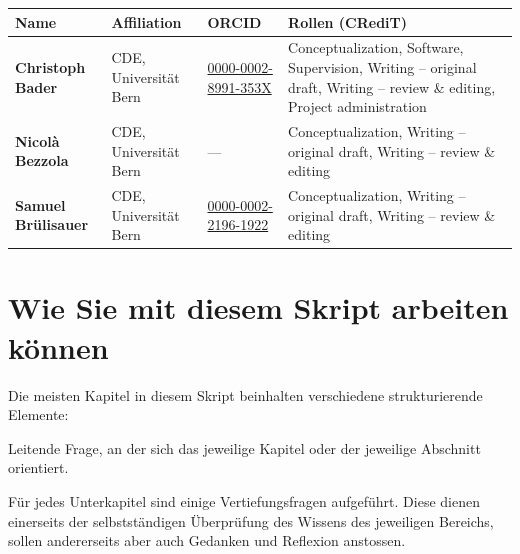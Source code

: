 \documentclass[
  nswissgerman,
  a4paper,
  DIV=11,
  numbers=noendperiod,
  oneside,
  openany]{scrreprt}
\begin{document}
\begin{table}[!h]
\centering\begingroup\fontsize{8}{10}\selectfont

\begin{tabular}[t]{>{\raggedright\arraybackslash}p{2.5cm}ll>{\raggedright\arraybackslash}p{6cm}}
\toprule
\textbf{Name} & \textbf{Affiliation} & \textbf{ORCID} & \textbf{Rollen (CRediT)}\\
\midrule
\textbf{Christoph Bader} & CDE, Universität Bern & \href{https://orcid.org/0000-0002-8991-353X}{0000-0002-8991-353X} & Conceptualization, Software, Supervision, Writing – original draft, Writing – review \& editing, Project administration\\
\textbf{Nicolà Bezzola} & CDE, Universität Bern & — & Conceptualization, Writing – original draft, Writing – review \& editing\\
\textbf{Samuel Brülisauer} & CDE, Universität Bern & \href{https://orcid.org/0000-0002-2196-1922}{0000-0002-2196-1922} & Conceptualization, Writing – original draft, Writing – review \& editing\\
\bottomrule
\end{tabular}
\endgroup{}
\end{table}

\section*{Wie Sie mit diesem Skript arbeiten
können}\label{wie-sie-mit-diesem-skript-arbeiten-kuxf6nnen}


Die meisten Kapitel in diesem Skript beinhalten verschiedene
strukturierende Elemente:

\begin{tcolorbox}[enhanced jigsaw, arc=.35mm, bottomrule=.15mm, bottomtitle=1mm, breakable, colback=white, colbacktitle=quarto-callout-note-color!10!white, colframe=quarto-callout-note-color-frame, coltitle=black, left=2mm, leftrule=.75mm, opacityback=0, opacitybacktitle=0.6, rightrule=.15mm, title={Leitfragen}, titlerule=0mm, toprule=.15mm, toptitle=1mm]

Leitende Frage, an der sich das jeweilige Kapitel oder der jeweilige
Abschnitt orientiert.

\end{tcolorbox}

\begin{tcolorbox}[enhanced jigsaw, arc=.35mm, bottomrule=.15mm, bottomtitle=1mm, breakable, colback=white, colbacktitle=quarto-callout-note-color!10!white, colframe=quarto-callout-note-color-frame, coltitle=black, left=2mm, leftrule=.75mm, opacityback=0, opacitybacktitle=0.6, rightrule=.15mm, title={Vertiefungsfragen und Übungen}, titlerule=0mm, toprule=.15mm, toptitle=1mm]

Für jedes Unterkapitel sind einige Vertiefungsfragen aufgeführt. Diese
dienen einerseits der selbstständigen Überprüfung des Wissens des
jeweiligen Bereichs, sollen andererseits aber auch Gedanken und
Reflexion anstossen.

\end{tcolorbox}
\end{document}
